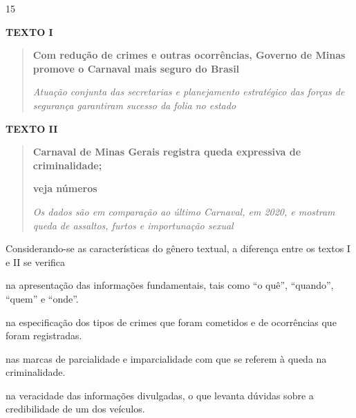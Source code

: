 \num{15}

\textbf{TEXTO I}

\begin{quote}
\textbf{Com redução de crimes e outras ocorrências, Governo de Minas
promove o Carnaval mais seguro do Brasil}

\emph{Atuação conjunta das secretarias e planejamento estratégico das
forças de segurança garantiram sucesso da folia no estado}
\end{quote}


\textbf{TEXTO II}

\begin{quote}
\textbf{Carnaval de Minas Gerais registra queda expressiva de
criminalidade;}

\textbf{veja números}

\emph{Os dados são em comparação ao último Carnaval, em 2020, e mostram
queda de assaltos, furtos e importunação sexual}
\end{quote}


Considerando-se as características do gênero textual, a diferença entre
os textos I e II se verifica

\begin{escolha}
\item na apresentação das informações fundamentais, tais como ``o quê'',
``quando'', ``quem'' e ``onde''.

\item na especificação dos tipos de crimes que foram cometidos e de
ocorrências que foram registradas.

\item nas marcas de parcialidade e imparcialidade com que se referem à
queda na criminalidade.

\item na veracidade das informações divulgadas, o que levanta dúvidas sobre
a credibilidade de um dos veículos.
\end{escolha}